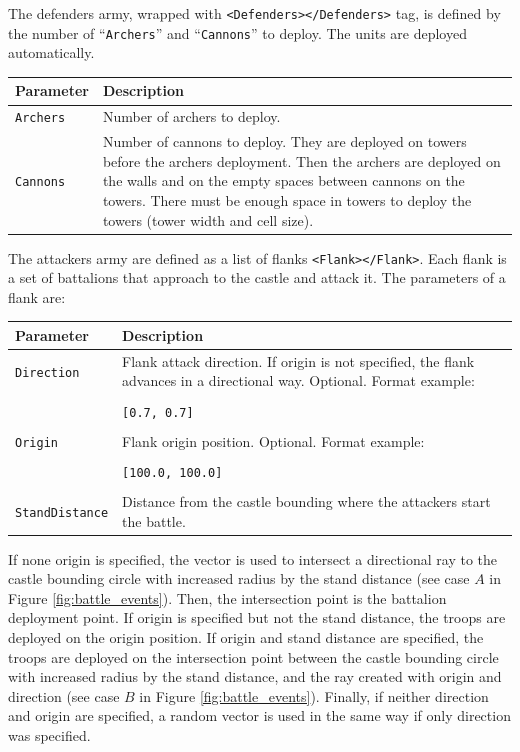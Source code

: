 \documentclass[tog]{acmsiggraph}
\begin{document}
The defenders army, wrapped with \texttt{<Defenders></Defenders>} tag, is defined by the number of ``\texttt{Archers}'' and ``\texttt{Cannons}'' to deploy.
The units are deployed automatically.
\newline

\begin{tabularx}{0.48\textwidth}{ |l|X| }
\hline 
\textbf{Parameter} & \textbf{Description} \\[0.15cm]
 \hline
 \texttt{Archers} & Number of archers to deploy. \\
 \hline
 \texttt{Cannons} & Number of cannons to deploy. They are deployed on towers before the archers deployment. Then the archers are deployed on the walls and on the empty spaces between cannons on the towers. There must be enough space in towers to deploy the towers (tower width and cell size). \\
 \hline
\end{tabularx} 
 



The attackers army are defined as a list of flanks \texttt{<Flank></Flank>}.
Each flank is a set of battalions that approach to the castle and attack it.
The parameters of a flank are: 

\begin{tabularx}{0.48\textwidth}{ |l|X| }
\hline 
\textbf{Parameter} & \textbf{Description} \\[0.15cm]
 \hline
 \texttt{Direction} & Flank attack direction. If origin is not specified, the flank advances in a directional way. Optional. Format example: \\
 & \\
 & \quad\texttt{[0.7, 0.7]} \\
 & \\
 \hline
 \texttt{Origin} & Flank origin position. Optional. Format example: \\
 & \\
 & \quad\texttt{[100.0, 100.0]} \\
 & \\ 
 \hline
 \texttt{StandDistance} & Distance from the castle bounding where the attackers start the battle. \\
 \hline
\end{tabularx} 

If none origin is specified, the vector is used to intersect a directional ray to the castle bounding circle with increased radius by the stand distance (see case $A$ in Figure \ref{fig:battle_events}). 
Then, the intersection point is the battalion deployment point.
If origin is specified but not the stand distance, the troops are deployed on the origin position.
If origin and stand distance are specified, the troops are deployed  on the intersection point between the castle bounding circle with increased radius by the stand distance, and the ray created with origin and direction  (see case $B$ in Figure \ref{fig:battle_events}).
Finally, if neither direction and origin are specified, a random vector is used in the same way if only direction was specified.
\end{document}
